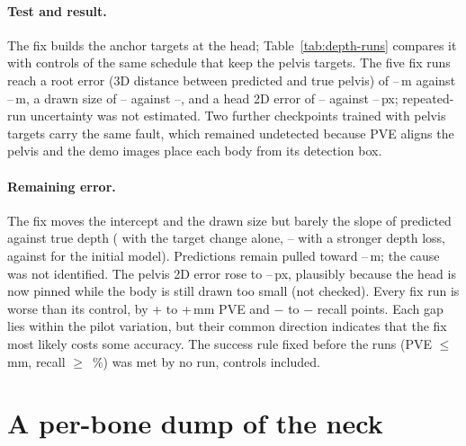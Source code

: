 \paragraph{Test and result.} The fix builds the anchor targets at the head; Table~\ref{tab:depth-runs} compares it
with controls of the same schedule that keep the pelvis targets. The five fix runs reach a root error (3D distance
between predicted and true pelvis) of \DiagRootErrFixLow--\DiagRootErrFixHigh\,m against
\DiagRootErrCtrlLow--\DiagRootErrCtrlHigh\,m, a drawn size of \DiagSizeFixLow--\DiagSizeFixHigh{} against
\DiagSizeCtrlLow--\DiagSizeCtrlHigh, and a head 2D error of \DiagHeadPxFixLow--\DiagHeadPxFixHigh{} against
\DiagHeadPxCtrlLow--\DiagHeadPxCtrlHigh\,px; repeated-run uncertainty was not estimated. Two further checkpoints
trained with pelvis targets carry the same fault, which remained undetected because PVE aligns the pelvis and the
demo images place each body from its detection box.

\paragraph{Remaining error.} The fix moves the intercept and the drawn size but barely the slope of predicted against true depth (\DiagSlopeSwitch{} with the target change alone,
\DiagSlopeStrongLow--\DiagSlopeStrongHigh{} with a stronger depth loss, against \DiagDepthSlopeBase{} for the initial
model). Predictions remain pulled toward \DiagDepthPullLow--\DiagDepthPullHigh\,m; the cause was not identified. The
pelvis 2D error rose to \DiagPelvisPxFixLow--\DiagPelvisPxFixHigh\,px, plausibly because the head is now pinned while
the body is still drawn too small (not checked). Every fix run is worse than its control, by
+\DiagFixCostPVELow{} to +\DiagFixCostPVEHigh\,mm PVE and $-$\DiagFixCostRecallLow{} to $-$\DiagFixCostRecallHigh{}
recall points. Each gap lies within the pilot variation, but their common direction indicates that the fix most
likely costs some accuracy. The success rule fixed before the runs (PVE $\le$ \DiagRulePVE\,mm, recall $\ge$
\DiagRuleRecall\,\%) was met by no run, controls included.

\section{A per-bone dump of the neck}
\label{sec:diag-neck}



